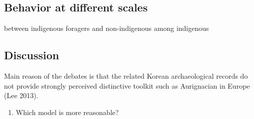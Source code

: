 \documentclass[american,man]{apa6}
\begin{document}
\subsection{Behavior at different
scales}\label{behavior-at-different-scales}

between indigenous foragers and non-indigenous among indigenous

\subsection{Discussion}\label{discussion}

Main reason of the debates is that the related Korean archaeological
records do not provide strongly perceived distinctive toolkit such as
Aurignacian in Europe (Lee 2013).

\begin{enumerate}
\def\labelenumi{\arabic{enumi})}
\itemsep1pt\parskip0pt
\item
  Which model is more reasonable?
\end{enumerate}
\end{document}
